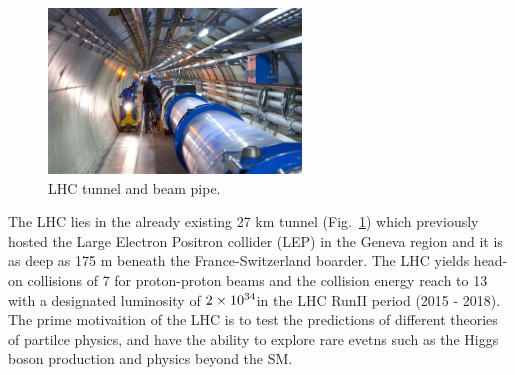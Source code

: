 \begin{figure}[H]\centering
    \includegraphics[width=0.6\textwidth]{figure/lhc_tunnel.jpg}
    \caption{LHC tunnel and beam pipe.}
    \label{fig:lhc_tunnel}
\end{figure}
The LHC lies in the already existing 27 km tunnel (Fig.~\ref{fig:lhc_tunnel}) which previously hosted the Large Electron Positron collider (LEP) in the Geneva region and it is as deep as 175 m  beneath the France-Switzerland boarder.
The LHC yields head-on collisions of 7 \TeV for proton-proton beams and the collision energy reach to 13 \TeV with a designated luminosity of $2 \times \text{10}^\text{34}$\percms in the LHC RunII period (2015 - 2018).
The prime motivaition of the LHC is to test the predictions of different theories of partilce physics, and have the ability to explore rare evetns such as the Higgs boson production and physics beyond the SM. 


